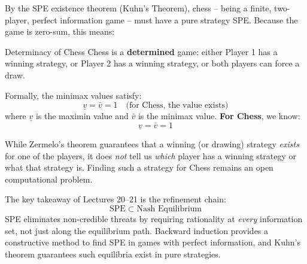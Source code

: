 \documentclass[12pt, a4paper]{article}
\begin{document}
By the SPE existence theorem (Kuhn's Theorem), chess -- being a finite, two-player, perfect information game -- must have a pure strategy SPE. Because the game is zero-sum, this means:

\begin{thmbox}{Determinacy of Chess}
  Chess is a \textbf{determined} game: either Player 1 has a winning strategy, or Player 2 has a winning strategy, or both players can force a draw.
\end{thmbox}

Formally, the minimax values satisfy:
\[
  \underline{v} = \bar{v} = 1 \quad \text{(for Chess, the value exists)}
\]
where $\underline{v}$ is the maximin value and $\bar{v}$ is the minimax value. \textbf{For Chess}, we know:
\[
  \underline{v} = \bar{v} = 1
\]

\begin{notebox}
  While Zermelo's theorem guarantees that a winning (or drawing) strategy \emph{exists} for one of the players, it does \emph{not} tell us \emph{which} player has a winning strategy or what that strategy is. Finding such a strategy for Chess remains an open computational problem.
\end{notebox}

\begin{takebox}
  The key takeaway of Lectures 20--21 is the refinement chain:
  \[
    \text{SPE} \;\subset\; \text{Nash Equilibrium}
  \]
  SPE eliminates non-credible threats by requiring rationality at \emph{every} information set, not just along the equilibrium path. Backward induction provides a constructive method to find SPE in games with perfect information, and Kuhn's theorem guarantees such equilibria exist in pure strategies.
\end{takebox}
\end{document}

